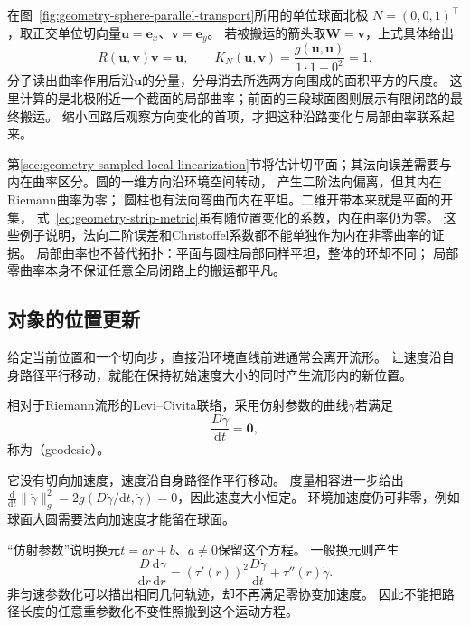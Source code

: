在图~\ref{fig:geometry-sphere-parallel-transport}所用的单位球面北极
$N=(0,0,1)^\top$，取正交单位切向量$\bm u=\bm e_x$、$\bm v=\bm e_y$。
若被搬运的箭头取$\bm W=\bm v$，上式具体给出
\[
 R(\bm u,\bm v)\bm v=\bm u,\qquad
 K_N(\bm u,\bm v)=
 \frac{g(\bm u,\bm u)}{1\cdot1-0^2}=1.
\]
分子读出曲率作用后沿$\bm u$的分量，分母消去所选两方向围成的面积平方的尺度。
这里计算的是北极附近一个截面的局部曲率；前面的三段球面图则展示有限闭路的最终搬运。
缩小回路后观察方向变化的首项，才把这种沿路变化与局部曲率联系起来。

第\ref{sec:geometry-sampled-local-linearization}节将估计切平面；其法向误差需要与内在曲率区分。圆的一维方向沿环境空间转动，
产生二阶法向偏离，但其内在Riemann曲率为零；
圆柱也有法向弯曲而内在平坦。二维开带本来就是平面的开集，
式~\eqref{eq:geometry-strip-metric}虽有随位置变化的系数，内在曲率仍为零。
这些例子说明，法向二阶误差和Christoffel系数都不能单独作为内在非零曲率的证据。
局部曲率也不替代拓扑：平面与圆柱局部同样平坦，整体的环却不同；
局部零曲率本身不保证任意全局闭路上的搬运都平凡。

\subsection{对象的位置更新}
\label{sec:geometry-position-updates}
\label{sec:geometry-geodesic-motion-minimization}

\label{sec:geometry-geodesic-motion}

给定当前位置和一个切向步，直接沿环境直线前进通常会离开流形。
让速度沿自身路径平行移动，就能在保持初始速度大小的同时产生流形内的新位置。

\begin{definition}[测地线]
\label{def:geometry-geodesic}
相对于Riemann流形的Levi--Civita联络，采用仿射参数的曲线$\gamma$若满足
\[
 \frac{D\dot\gamma}{\mathrm dt}=\bm0,
\]
称为（geodesic）。
\end{definition}
它没有切向加速度，速度沿自身路径作平行移动。
度量相容进一步给出
$\frac{\mathrm d}{\mathrm dt}\lVert\dot\gamma\rVert_g^2
=2g(D\dot\gamma/\mathrm dt,\dot\gamma)=0$，因此速度大小恒定。
环境加速度仍可非零，例如球面大圆需要法向加速度才能留在球面。

“仿射参数”说明换元$t=ar+b$、$a\neq0$保留这个方程。
一般换元则产生
\[
 \frac{D}{\mathrm dr}\frac{\mathrm d\gamma}{\mathrm dr}
 =(\tau'(r))^2\frac{D\dot\gamma}{\mathrm dt}
   +\tau''(r)\dot\gamma.
\]
非匀速参数化可以描出相同几何轨迹，却不再满足零协变加速度。
因此不能把路径长度的任意重参数化不变性照搬到这个运动方程。

